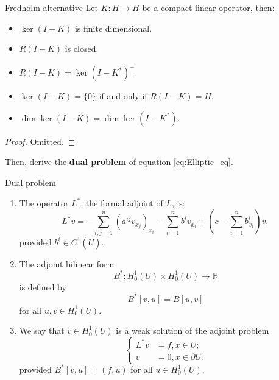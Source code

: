 \begin{theorem}{Fredholm alternative}
    \label{thm:Fredholm}
    Let $K:H\rightarrow H$ be a compact linear operator, then:
    \begin{itemize}
        \item $\ker(I-K)$ is finite dimensional.
        \item $R(I-K)$ is closed.
        \item $R(I-K)=\ker(I-K^{*})^{\perp}$.
        \item $\ker(I-K)=\{0\}$ if and only if $R(I-K)=H$.
        \item $\dim\ker(I-K)=\dim\ker(I-K^{*})$.
    \end{itemize}
\end{theorem}
\begin{proof}
    Omitted.
\end{proof}
Then, derive the \textbf{dual problem} of equation \eqref{eq:Elliptic_eq}.
\begin{definition}{Dual problem}
    \begin{enumerate}
        \item The operator $L^{*}$, the formal adjoint of $L$, is:
        \begin{equation}
            \label{eq:dual_op}
            L^{*}v=-\sum_{i,j=1}^{n}\left(a^{ij}v_{x_{j}}\right)_{x_{i}}-\sum_{i=1}^{n}b^{i}v_{x_{i}}+(c-\sum_{i=1}^{n}b_{x_{i}}^{i})v,
        \end{equation}
        provided $b^{i}\in C^{1}(\bar{U})$.
        \item The adjoint bilinear form 
        \begin{equation}
            \label{eq:dualB}
            B^{*}:H_{0}^{1}(U)\times H_{0}^{1}(U)\rightarrow\mathbb{R}
        \end{equation}
        is defined by 
        \begin{equation}
            \label{eq:dual_B}
            B^{*}[v,u]=B[u,v]
        \end{equation}
        for all $u,v\in H_{0}^{1}(U)$.
        \item We say that $v\in H_{0}^{1}(U)$ is a weak solution of the adjoint problem 
        \begin{equation}
            \label{eq:adj_problem}
            \left\{
                \begin{aligned}
                    L^{*}v&=f,x\in U;\\
                    v&=0,x\in\partial U.
                \end{aligned}
            \right.
        \end{equation}
        provided $B^{*}[v,u]=(f,u)$ for all $u\in H_{0}^{1}(U)$.
    \end{enumerate}
\end{definition}
